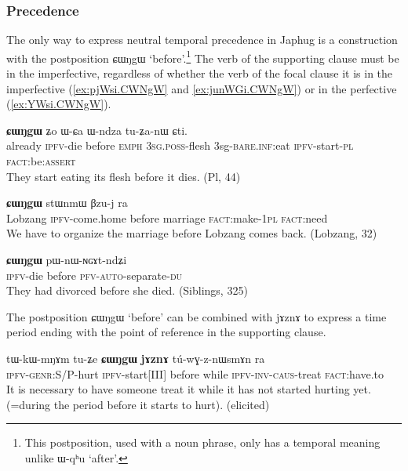 \documentclass[oldfontcommands,oneside,a4paper,11pt]{article}
\newcommand{\ipa}[1]{{\phon \mbox{#1}}} %
\begin{document}
\subsubsection{Precedence} \label{sec:precedence}
The only way to express neutral temporal precedence  in Japhug  is a construction with the postposition  \ipa{ɕɯŋgɯ} `before'.\footnote{This postposition, used with a noun phrase, only has a temporal meaning unlike \ipa{ɯ-qʰu} `after'.} The verb of the supporting clause must be in the imperfective, regardless of whether the verb of the focal clause it is in the imperfective  (\ref{ex:pjWsi.CWNgW} and \ref{ex:junWGi.CWNgW}) or in the perfective   (\ref{ex:YWsi.CWNgW}).

\begin{exe}
\ex \label{ex:pjWsi.CWNgW}
\gll [\ipa{pɤjkʰu}  	\ipa{pjɯ-si}]  	\textbf{\ipa{ɕɯŋgɯ}}  	\ipa{ʑo}  	\ipa{ɯ-ɕa}  	\ipa{ɯ-ndza}  	\ipa{tu-ʑa-nɯ}  	\ipa{ɕti.}  \\
already \textsc{ipfv}-die before \textsc{emph} \textsc{3sg.poss}-flesh 3sg-\textsc{bare.inf}:eat \textsc{ipfv}-start-\textsc{pl} \textsc{fact}:be:\textsc{assert} \\
\glt They start eating its flesh before it dies. (Pl, 44)
\end{exe}

\begin{exe}
\ex \label{ex:junWGi.CWNgW}
\gll
[\ipa{lɤβzaŋ}  	\ipa{ju-nɯɣi}]  	\textbf{\ipa{ɕɯŋgɯ}}  	\ipa{stɯnmɯ}  	\ipa{βzu-j}  	\ipa{ra}  \\
Lobzang \textsc{ipfv}-come.home before marriage \textsc{fact}:make-\textsc{1pl} \textsc{fact}:need \\
\glt We have to organize the marriage before Lobzang comes back. (Lobzang, 32)
\end{exe}

\begin{exe}
\ex \label{ex:YWsi.CWNgW}
\gll
[\ipa{ɲɯ-si}]  	\textbf{\ipa{ɕɯŋgɯ}}  	\ipa{pɯ-nɯ-ɴɢɤt-ndʑi}  \\
\textsc{ipfv}-die before \textsc{pfv-auto}-separate-\textsc{du} \\
\glt They had divorced before she died. (Siblings, 325)
\end{exe}

The postposition \ipa{ɕɯŋgɯ} `before' can be combined with  \ipa{jɤznɤ} to express a time period ending with the point of reference in the supporting clause.

\begin{exe}
\ex \label{ex:CWNgW.jAZnA}
\gll
\ipa{tɯ-kɯ-mŋɤm}  	\ipa{tu-ʑe}  	\ipa{\textbf{ɕɯŋgɯ}}  	\ipa{\textbf{jɤznɤ}}  	\ipa{tú-wɣ-z-nɯsmɤn}  	\ipa{ra}  \\
\textsc{ipfv-genr}:S/P-hurt \textsc{ipfv}-start[III] before while \textsc{ipfv-inv-caus}-treat \textsc{fact}:have.to \\
\glt It is necessary to have someone treat it while it has not started hurting yet. (=during the period before it starts to hurt). (elicited)
\end{exe}
 
\end{document}
